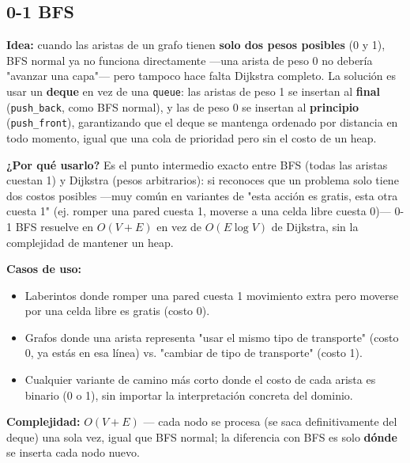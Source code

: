 \documentclass[10pt,a4paper,twocolumn]{article}
\begin{document}
\subsection{0-1 BFS}

\textbf{Idea:} cuando las aristas de un grafo tienen \textbf{solo dos
	pesos posibles} (0 y 1), BFS normal ya no funciona directamente
—una arista de peso 0 no debería "avanzar una capa"— pero tampoco
hace falta Dijkstra completo. La solución es usar un
\textbf{deque} en vez de una \texttt{queue}: las aristas de peso 1 se
insertan al \textbf{final} (\texttt{push\_back}, como BFS normal), y
las de peso 0 se insertan al \textbf{principio}
(\texttt{push\_front}), garantizando que el deque se mantenga
ordenado por distancia en todo momento, igual que una cola de
prioridad pero sin el costo de un heap.

\textbf{¿Por qué usarlo?} Es el punto intermedio exacto entre BFS
(todas las aristas cuestan 1) y Dijkstra (pesos arbitrarios): si
reconoces que un problema solo tiene dos costos posibles —muy común
en variantes de "esta acción es gratis, esta otra cuesta 1"
(ej. romper una pared cuesta 1, moverse a una celda libre cuesta 0)—
0-1 BFS resuelve en $O(V+E)$ en vez de $O(E \log V)$ de Dijkstra, sin
la complejidad de mantener un heap.

\textbf{Casos de uso:}

\begin{itemize}
	\item Laberintos donde romper una pared cuesta 1 movimiento extra
	pero moverse por una celda libre es gratis (costo 0).
	\item Grafos donde una arista representa "usar el mismo tipo de
	transporte" (costo 0, ya estás en esa línea) vs. "cambiar de
	tipo de transporte" (costo 1).
	\item Cualquier variante de camino más corto donde el costo de
	cada arista es binario (0 o 1), sin importar la interpretación
	concreta del dominio.
\end{itemize}

\textbf{Complejidad:} $O(V + E)$ — cada nodo se procesa (se saca
definitivamente del deque) una sola vez, igual que BFS normal; la
diferencia con BFS es solo \textbf{dónde} se inserta cada nodo nuevo.
\end{document}
